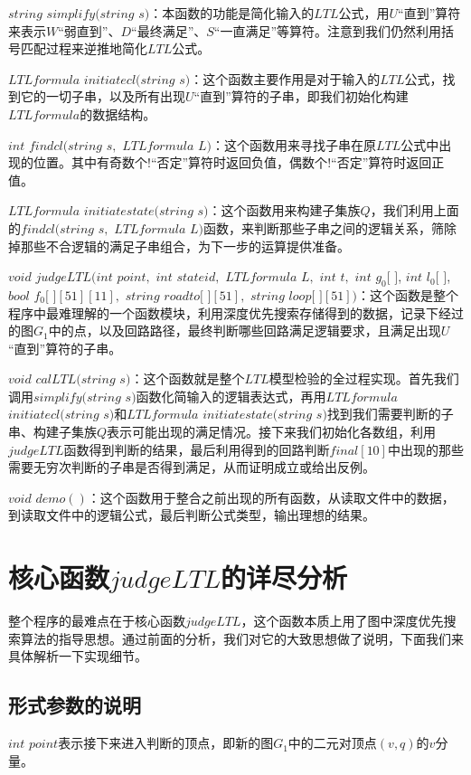\documentclass[UTF8]{ctexart}
\begin{document}
$string$ $simplify (string$ $s)$：本函数的功能是简化输入的$LTL$公式，用$U$“直到”算符来表示$W$“弱直到”、$D$“最终满足”、$S$“一直满足”等算符。注意到我们仍然利用括号匹配过程来逆推地简化$LTL$公式。
 
$LTLformula$ $initiatecl(string$ $s)$：这个函数主要作用是对于输入的$LTL$公式，找到它的一切子串，以及所有出现$U$“直到”算符的子串，即我们初始化构建$LTLformula$的数据结构。

$int$ $findcl(string$ $s,$ $LTLformula$ $L)$：这个函数用来寻找子串在原$LTL$公式中出现的位置。其中有奇数个$!$“否定”算符时返回负值，偶数个$!$“否定”算符时返回正值。

$LTLformula$ $initiatestate(string$ $s)$：这个函数用来构建子集族$Q$，我们利用上面的$findcl(string$ $s,$ $LTLformula$ $L)$函数，来判断那些子串之间的逻辑关系，筛除掉那些不合逻辑的满足子串组合，为下一步的运算提供准备。

$void$ $judgeLTL(int$ $point,$ $int$ $stateid,$ $LTLformula$ $L,$ $int$ $t,$ $int$ $g_{0}$$[$ $]$, $int$ $l_{0}$$[$ $]$, $bool$ $f_{0}$$[$ $][51][11],$ $string$ $roadto[$ $][51],$ $string$ $loop[$ $][51])$：这个函数是整个程序中最难理解的一个函数模块，利用深度优先搜索存储得到的数据，记录下经过的图$G_{1}$中的点，以及回路路径，最终判断哪些回路满足逻辑要求，且满足出现$U$“直到”算符的子串。

$void$ $calLTL(string$ $s)$：这个函数就是整个$LTL$模型检验的全过程实现。首先我们调用$simplify (string$ $s)$函数化简输入的逻辑表达式，再用$LTLformula$ $initiatecl(string$ $s)$和$LTLformula$ $initiatestate(string$ $s)$找到我们需要判断的子串、构建子集族$Q$表示可能出现的满足情况。接下来我们初始化各数组，利用$judgeLTL $函数得到判断的结果，最后利用得到的回路判断$final[10]$中出现的那些需要无穷次判断的子串是否得到满足，从而证明成立或给出反例。

$void$ $demo()$：这个函数用于整合之前出现的所有函数，从读取文件中的数据，到读取文件中的逻辑公式，最后判断公式类型，输出理想的结果。

\section{核心函数$judgeLTL $的详尽分析}
整个程序的最难点在于核心函数$judgeLTL $，这个函数本质上用了图中深度优先搜索算法的指导思想。通过前面的分析，我们对它的大致思想做了说明，下面我们来具体解析一下实现细节。

\subsection{形式参数的说明}
$int$ $point$表示接下来进入判断的顶点，即新的图$G_{1}$中的二元对顶点$(v, q)$的$v$分量。
\end{document}
